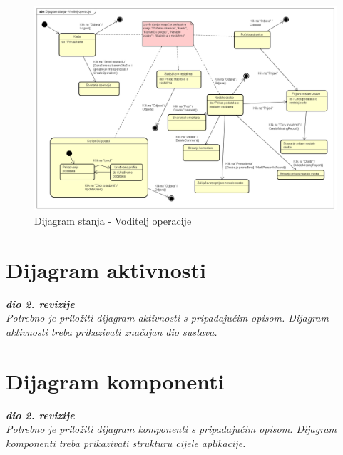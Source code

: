 			\begin{figure}[h!] \includegraphics[width=\linewidth]{dijagrami/Dijagram stanja - Voditelj operacije.png}
				\caption{Dijagram stanja - Voditelj operacije}
			\end{figure}
   
			\eject 
		
		\section{Dijagram aktivnosti}
			
			\textbf{\textit{dio 2. revizije}}\\
			
			 \textit{Potrebno je priložiti dijagram aktivnosti s pripadajućim opisom. Dijagram aktivnosti treba prikazivati značajan dio sustava.}
			
			\eject
		\section{Dijagram komponenti}
		
			\textbf{\textit{dio 2. revizije}}\\
		
			 \textit{Potrebno je priložiti dijagram komponenti s pripadajućim opisom. Dijagram komponenti treba prikazivati strukturu cijele aplikacije.}
